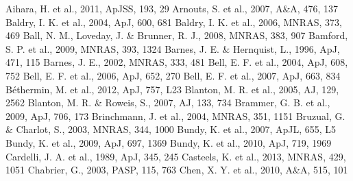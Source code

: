 \documentclass{mn2e}
\begin{document}
\begin{thebibliography}{}
 Aihara, H. et al., 2011, ApJSS, 193, 29
 Arnouts, S. et al., 2007, A\&A, 476, 137
 Baldry, I. K. et al., 2004, ApJ, 600, 681
 Baldry, I. K. et al., 2006, MNRAS, 373, 469
 Ball, N. M., Loveday, J. \& Brunner, R. J., 2008, MNRAS, 383, 907
 Bamford, S. P. et al., 2009, MNRAS, 393, 1324
 Barnes, J. E. \& Hernquist, L., 1996, ApJ, 471, 115
 Barnes, J. E., 2002, MNRAS, 333, 481
 Bell, E. F. et al., 2004, ApJ, 608, 752
 Bell, E. F. et al., 2006, ApJ, 652, 270
 Bell, E. F. et al., 2007, ApJ, 663, 834
 B\'ethermin, M. et al., 2012, ApJ, 757, L23
 Blanton, M. R. et al., 2005, AJ, 129, 2562
 Blanton, M. R. \& Roweis, S., 2007, AJ, 133, 734
 Brammer, G. B. et al., 2009, ApJ, 706, 173
 Brinchmann, J. et al., 2004, MNRAS, 351, 1151
 Bruzual, G. \& Charlot, S., 2003, MNRAS, 344, 1000
 Bundy, K. et al., 2007, ApJL, 655, L5
 Bundy, K. et al., 2009, ApJ, 697, 1369
 Bundy, K. et al., 2010, ApJ, 719, 1969
 Cardelli, J. A. et al., 1989, ApJ, 345, 245
 Casteels, K. et al., 2013, MNRAS, 429, 1051
 Chabrier, G., 2003, PASP, 115, 763
 Chen, X. Y. et al., 2010, A\&A, 515, 101

\end{thebibliography}
\end{document}
